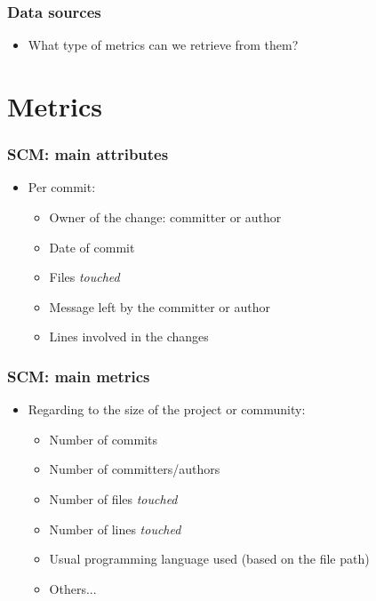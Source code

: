 \documentclass{beamer}
\begin{document}

\begin{frame}
 \frametitle{Data sources}
 \begin{itemize}
 \item What type of metrics can we retrieve from them?
 \end{itemize}
\end{frame}



\section{Metrics}
\begin{frame}
 \frametitle{SCM: main attributes}
 \begin{itemize}
  
  \item Per commit:
   \begin{itemize}
    \item Owner of the change: committer or author
    \item Date of commit
    \item Files \emph{touched}
    \item Message left by the committer or author
    \item Lines involved in the changes
   \end{itemize} 
 \end{itemize}
\end{frame}


\begin{frame}
 \frametitle{SCM: main metrics}
 \begin{itemize}
 \item Regarding to the size of the project or community:
   \begin{itemize}
    \item Number of commits
    \item Number of committers/authors
    \item Number of files \emph{touched}
    \item Number of lines \emph{touched}
    \item Usual programming language used (based on the file path)
    \item Others...
   \end{itemize}
 \end{itemize}
\end{frame}
\end{document}
